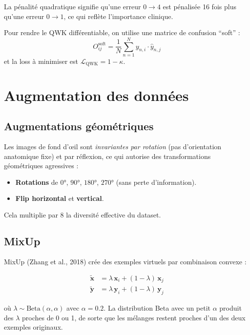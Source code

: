\documentclass[11pt,a4paper]{article}
\begin{document}
La pénalité quadratique signifie qu'une erreur $0 \to 4$ est pénalisée 16 fois plus qu'une erreur $0 \to 1$, ce qui reflète l'importance clinique.

Pour rendre le QWK différentiable, on utilise une matrice de confusion ``soft'' :
\begin{equation}
  O^{\text{soft}}_{ij} = \frac{1}{N} \sum_{n=1}^{N} y_{n,i} \cdot \hat{y}_{n,j}
\end{equation}
et la loss à minimiser est $\mathcal{L}_{\text{QWK}} = 1 - \kappa$.

\section{Augmentation des données}

\subsection{Augmentations géométriques}

Les images de fond d'œil sont \emph{invariantes par rotation} (pas d'orientation anatomique fixe) et par réflexion, ce qui autorise des transformations géométriques agressives :

\begin{itemize}[leftmargin=2em]
  \item \textbf{Rotations} de $0°$, $90°$, $180°$, $270°$ (sans perte d'information).
  \item \textbf{Flip horizontal} et \textbf{vertical}.
\end{itemize}

Cela multiplie par 8 la diversité effective du dataset.

\subsection{MixUp}

MixUp (Zhang et al., 2018) crée des exemples virtuels par combinaison convexe :

\begin{align}
  \tilde{\mathbf{x}} &= \lambda\,\mathbf{x}_i + (1-\lambda)\,\mathbf{x}_j \\
  \tilde{\mathbf{y}} &= \lambda\,\mathbf{y}_i + (1-\lambda)\,\mathbf{y}_j
\end{align}

où $\lambda \sim \text{Beta}(\alpha, \alpha)$ avec $\alpha = 0.2$. La distribution Beta avec un petit $\alpha$ produit des $\lambda$ proches de 0 ou 1, de sorte que les mélanges restent proches d'un des deux exemples originaux.
\end{document}
